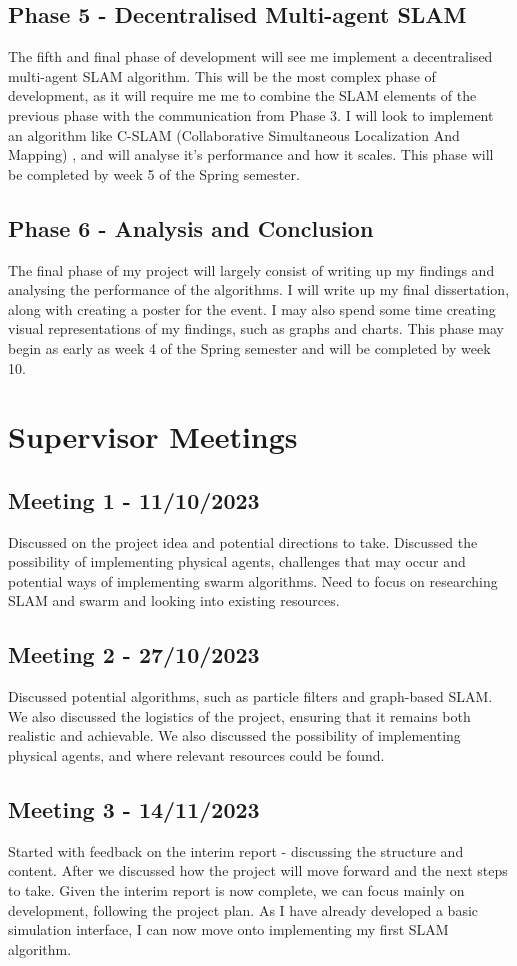 \documentclass[12pt]{article}
\begin{document}
\subsection{Phase 5 - Decentralised Multi-agent SLAM}
The fifth and final phase of development will see me implement a decentralised multi-agent SLAM algorithm. This will be the most
complex phase of development, as it will require me me to combine the SLAM elements of the previous phase with the communication
from Phase 3. I will look to implement an algorithm like C-SLAM (Collaborative Simultaneous Localization And Mapping) \cite{C-SLAM}, and will analyse it's performance and how it scales. This phase
will be completed by week 5 of the Spring semester.
\subsection{Phase 6 - Analysis and Conclusion}
The final phase of my project will largely consist of writing up my findings and analysing the performance of the algorithms. I will
write up my final dissertation, along with creating a poster for the event. I may also spend some time creating visual representations
of my findings, such as graphs and charts. This phase may begin as early as week 4 of the Spring semester and will be completed by
week 10.
\section{Supervisor Meetings}
\subsection{Meeting 1 - 11/10/2023}
Discussed on the project idea and potential directions to take. Discussed the possibility of implementing physical agents,
challenges that may occur and potential ways of implementing swarm algorithms. Need to focus on researching SLAM and swarm
and looking into existing resources.
\subsection{Meeting 2 - 27/10/2023}
Discussed potential algorithms, such as particle filters and graph-based SLAM. We also discussed the logistics of the project,
ensuring that it remains both realistic and achievable. We also discussed the possibility of implementing physical agents,
and where relevant resources could be found.
\subsection{Meeting 3 - 14/11/2023}
Started with feedback on the interim report - discussing the structure and content. After we discussed how the project will
move forward and the next steps to take. Given the interim report is now complete, we can focus mainly on development, following
the project plan. As I have already developed a basic simulation interface, I can now move onto implementing my first SLAM algorithm.
\end{document}
